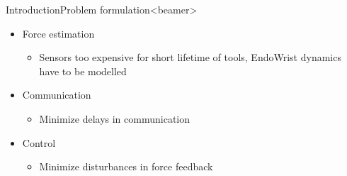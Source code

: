 \begin{frame}{Introduction}{Problem formulation}<beamer>
\begin{itemize}

\item Force estimation
\begin{itemize}
\item Sensors too expensive for short lifetime of tools, EndoWrist dynamics have to be modelled
\end{itemize}
\item Communication
\begin{itemize}
	\item Minimize delays in communication
\end{itemize}
\item Control
\begin{itemize}
\item Minimize disturbances in force feedback
\end{itemize}
\end{itemize}
\end{frame}